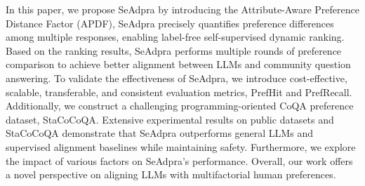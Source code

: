 

In this paper, we propose SeAdpra by introducing the Attribute-Aware Preference Distance Factor (APDF), SeAdpra precisely quantifies preference differences among multiple responses, enabling label-free self-supervised dynamic ranking. Based on the ranking results, SeAdpra performs multiple rounds of preference comparison to achieve better alignment between LLMs and community question answering.
To validate the effectiveness of SeAdpra, we introduce cost-effective, scalable, transferable, and consistent evaluation metrics, PrefHit and PrefRecall. Additionally, we construct a challenging programming-oriented CoQA preference dataset, StaCoCoQA. Extensive experimental results on public datasets and StaCoCoQA demonstrate that SeAdpra outperforms general LLMs and supervised alignment baselines while maintaining safety.
Furthermore, we explore the impact of various factors on SeAdpra’s performance. Overall, our work offers a novel perspective on aligning LLMs with multifactorial human preferences.